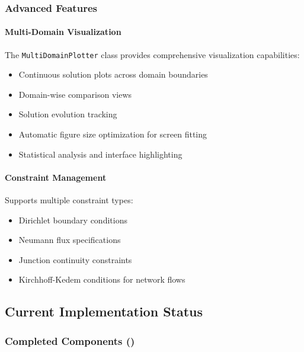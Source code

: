 \subsubsection{Advanced Features}

\paragraph{Multi-Domain Visualization}
The \texttt{MultiDomainPlotter} class provides comprehensive visualization capabilities:
\begin{itemize}
    \item Continuous solution plots across domain boundaries
    \item Domain-wise comparison views
    \item Solution evolution tracking
    \item Automatic figure size optimization for screen fitting
    \item Statistical analysis and interface highlighting
\end{itemize}

\paragraph{Constraint Management}
Supports multiple constraint types:
\begin{itemize}
    \item Dirichlet boundary conditions
    \item Neumann flux specifications
    \item Junction continuity constraints
    \item Kirchhoff-Kedem conditions for network flows
\end{itemize}

\subsection{Current Implementation Status}

\subsubsection{Completed Components (\textcolor{green}{\checkmark})}

